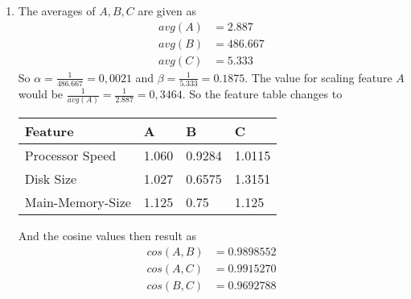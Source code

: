 \begin{enumerate}[label=(\alph*)]
    \item The averages of $A, B, C$ are given as
    \begin{align*}
        avg(A) &= 2.887 \\
        avg(B) &= 486.667 \\
        avg(C) &= 5.333
    \end{align*}
    So $\alpha = \frac{1}{486.667} = 0,0021$ and $\beta = \frac{1}{5.333} = 0.1875$. The value for scaling feature $A$ would be $\frac{1}{avg(A)} = \frac{1}{2.887} = 0,3464$. So the feature table changes to
    \begin{table}[!htb]
        \centering
        \begin{tabular}{llll}
        \hline
        \textbf{Feature} & \textbf{A} & \textbf{B} & \textbf{C} \\ \hline
        Processor Speed  & 1.060      & 0.9284      & 1.0115       \\
        Disk Size        & 1.027      & 0.6575        & 1.3151        \\
        Main-Memory-Size & 1.125          & 0.75        & 1.125          \\ \hline
        \end{tabular}
    \end{table}

    And the cosine values then result as 
    \begin{align*}
        cos(A,B) &= 0.9898552 \\
        cos(A,C) &= 0.9915270 \\
        cos(B,C) &= 0.9692788
    \end{align*}
    
\end{enumerate}




